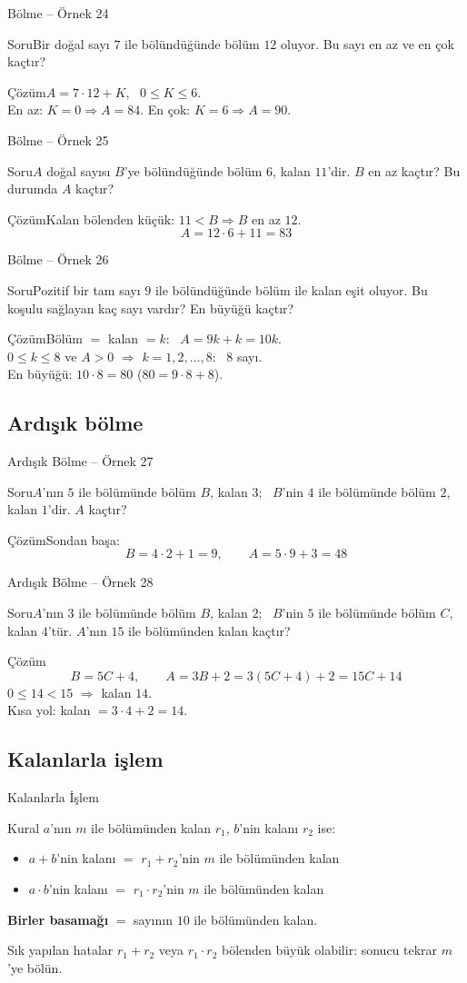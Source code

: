 \documentclass[aspectratio=169,11pt]{beamer}
\newcommand{\soru}[3]{%
\begin{frame}{#1}
  \begin{block}{Soru}\large #2\end{block}
  \pause
  \begin{exampleblock}{Çözüm}\large #3\end{exampleblock}
\end{frame}}
\begin{document}
\soru{Bölme -- Örnek 24}
{Bir doğal sayı \(7\) ile bölündüğünde bölüm \(12\) oluyor. Bu sayı en az ve en çok kaçtır?}
{\(A=7\cdot 12+K\), \ \(0\le K\le 6\).\\[3pt]
En az: \(K=0\Rightarrow A=84\). \qquad En çok: \(K=6\Rightarrow A=90\).}

\soru{Bölme -- Örnek 25}
{\(A\) doğal sayısı \(B\)'ye bölündüğünde bölüm \(6\), kalan \(11\)'dir. \(B\) en az kaçtır? Bu durumda \(A\) kaçtır?}
{Kalan bölenden küçük: \(11<B\Rightarrow B\) en az \(12\).
\[A=12\cdot 6+11=83\]}

\soru{Bölme -- Örnek 26}
{Pozitif bir tam sayı \(9\) ile bölündüğünde bölüm ile kalan eşit oluyor. Bu koşulu sağlayan kaç sayı vardır? En büyüğü kaçtır?}
{Bölüm \(=\) kalan \(=k\): \ \(A=9k+k=10k\).\\[3pt]
\(0\le k\le 8\) ve \(A>0\) \(\Rightarrow\) \(k=1,2,\dots,8\): \ \(8\) sayı.\\[3pt]
En büyüğü: \(10\cdot 8=80\) \quad (\(80=9\cdot 8+8\)).}

\subsection{Ardışık bölme}
\soru{Ardışık Bölme -- Örnek 27}
{\(A\)'nın \(5\) ile bölümünde bölüm \(B\), kalan \(3\); \ \(B\)'nin \(4\) ile bölümünde bölüm \(2\), kalan \(1\)'dir. \(A\) kaçtır?}
{Sondan başa:
\[B=4\cdot 2+1=9,\qquad A=5\cdot 9+3=48\]}

\soru{Ardışık Bölme -- Örnek 28}
{\(A\)'nın \(3\) ile bölümünde bölüm \(B\), kalan \(2\); \ \(B\)'nin \(5\) ile bölümünde bölüm \(C\), kalan \(4\)'tür. \(A\)'nın \(15\) ile bölümünden kalan kaçtır?}
{\[B=5C+4,\qquad A=3B+2=3(5C+4)+2=15C+14\]
\(0\le 14<15\) \(\Rightarrow\) kalan \(14\).\\[3pt]
Kısa yol: kalan \(=3\cdot 4+2=14\).}

\subsection{Kalanlarla işlem}
\begin{frame}{Kalanlarla İşlem}
\begin{block}{Kural}
\(a\)'nın \(m\) ile bölümünden kalan \(r_1\), \(b\)'nin kalanı \(r_2\) ise:
\begin{itemize}
\item \(a+b\)'nin kalanı \(=\) \(r_1+r_2\)'nin \(m\) ile bölümünden kalan
\item \(a\cdot b\)'nin kalanı \(=\) \(r_1\cdot r_2\)'nin \(m\) ile bölümünden kalan
\end{itemize}
\textbf{Birler basamağı} \(=\) sayının \(10\) ile bölümünden kalan.
\end{block}
\begin{alertblock}{Sık yapılan hatalar}
\(r_1+r_2\) veya \(r_1\cdot r_2\) bölenden büyük olabilir: sonucu tekrar \(m\)'ye bölün.
\end{alertblock}
\end{frame}
\end{document}
